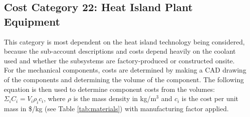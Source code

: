 
\subsection{Cost Category 22: Heat Island Plant Equipment}

This category is most dependent on the heat island technology being considered, because the sub-account descriptions and costs depend heavily on the coolant used and whether the subsystems are factory-produced or constructed onsite. \\

For the mechanical components, costs are determined by making a CAD drawing of the components  and determining the volume of the component.  The following equation is then used to determine
component costs from the volumes: $\Sigma_{i} C_{i} = V_{i}  \rho_{i}c_{i}$, where $\rho$ is  the mass density in kg/m$^{3}$ and $c_{i}$ is the cost per unit mass in \$/kg (see Table \ref{tab:materials})  with manufacturing factor applied.

